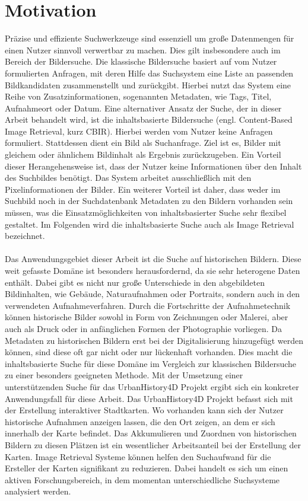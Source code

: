 \section*{Motivation}
Präzise und effiziente Suchwerkzeuge sind essenziell um große Datenmengen für einen Nutzer sinnvoll verwertbar zu machen. Dies gilt insbesondere auch im Bereich der Bildersuche. Die klassische Bildersuche basiert auf vom Nutzer formulierten Anfragen, mit deren Hilfe das Suchsystem eine Liste an passenden Bildkandidaten zusammenstellt und zurückgibt. Hierbei nutzt das System eine Reihe von Zusatzinformationen, sogenannten Metadaten, wie Tags, Titel, Aufnahmeort oder Datum. Eine alternativer Ansatz der Suche, der in dieser Arbeit behandelt wird, ist die inhaltsbasierte Bildersuche (engl. Content-Based Image Retrieval, kurz CBIR). Hierbei werden vom Nutzer keine Anfragen formuliert. Stattdessen dient ein Bild als Suchanfrage. Ziel ist es, Bilder mit gleichem oder ähnlichem Bildinhalt als Ergebnis zurückzugeben. Ein Vorteil dieser Herangehensweise ist, dass der Nutzer keine Informationen über den Inhalt des Suchbildes benötigt. Das System arbeitet ausschließlich mit den Pixelinformationen der Bilder. Ein weiterer Vorteil ist daher, dass weder im Suchbild noch in der Suchdatenbank Metadaten zu den Bildern vorhanden sein müssen, was die Einsatzmöglichkeiten von inhaltsbasierter Suche sehr flexibel gestaltet. Im Folgenden wird die inhaltsbasierte Suche auch als Image Retrieval bezeichnet.
\\\\
Das Anwendungsgebiet dieser Arbeit ist die Suche auf historischen Bildern. Diese weit gefasste Domäne ist besonders herausfordernd, da sie sehr heterogene Daten enthält. Dabei gibt es nicht nur große Unterschiede in den abgebildeten Bildinhalten, wie Gebäude, Naturaufnahmen oder Portraits, sondern auch in den verwendeten Aufnahmeverfahren. Durch die Fortschritte der Aufnahmetechnik können historische Bilder sowohl in Form von Zeichnungen oder Malerei, aber auch als Druck oder in anfänglichen Formen der Photographie vorliegen. Da Metadaten zu historischen Bildern erst bei der Digitalisierung hinzugefügt werden können, sind diese oft gar nicht oder nur lückenhaft vorhanden. Dies macht die inhaltsbasierte Suche für diese Domäne im Vergleich zur klassischen Bildersuche zu einer besonders geeigneten Methode. Mit der Umsetzung einer unterstützenden Suche für das UrbanHistory4D Projekt \cite{urbanhistory4d} ergibt sich ein konkreter Anwendungsfall für diese Arbeit. Das UrbanHistory4D Projekt befasst sich mit der Erstellung interaktiver Stadtkarten. Wo vorhanden kann sich der Nutzer historische Aufnahmen anzeigen lassen, die den Ort zeigen, an dem er sich innerhalb der Karte befindet. Das Akkumulieren und Zuordnen von historischen Bildern zu diesen Plätzen ist ein wesentlicher Arbeitsanteil bei der Erstellung der Karten. Image Retrieval Systeme können helfen den Suchaufwand für die Ersteller der Karten signifikant zu reduzieren. Dabei handelt es sich um einen aktiven Forschungsbereich, in dem momentan unterschiedliche Suchsysteme analysiert werden. 
